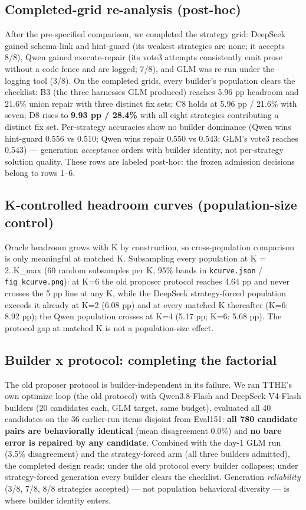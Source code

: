 \subsection{Completed-grid re-analysis
(post-hoc)}\label{completed-grid-re-analysis-post-hoc}

After the pre-specified comparison, we completed the strategy grid:
DeepSeek gained schema-link and hint-guard (its weakest strategies are
none; it accepts 8/8), Qwen gained execute-repair (its vote3 attempts
consistently emit prose without a code fence and are logged; 7/8), and
GLM was re-run under the logging tool (3/8). On the completed grids,
every builder's population clears the checklist: B3 (the three harnesses
GLM produced) reaches 5.96 pp headroom and 21.6\% union repair with
three distinct fix sets; C8 holds at 5.96 pp / 21.6\% with seven; D8
rises to \textbf{9.93 pp / 28.4\%} with all eight strategies
contributing a distinct fix set. Per-strategy accuracies show no builder
dominance (Qwen wins hint-guard 0.556 vs 0.510; Qwen wins repair 0.550 vs 0.543; GLM's vote3 reaches 0.543) --- generation
\emph{acceptance} orders with builder identity, not per-strategy solution
quality.
These rows are labeled post-hoc: the frozen admission decisions belong
to rows 1--6.
\subsection{K-controlled headroom curves (population-size
control)}\label{k-controlled-headroom-curves-population-size-control}

Oracle headroom grows with K by construction, so cross-population
comparison is only meaningful at matched K. Subsampling every population
at K = 2..K\_max (60 random subsamples per K, 95\% bands in
\texttt{kcurve.json} / \texttt{fig\_kcurve.png}): at K=6 the old
proposer protocol reaches 4.64 pp and never crosses the 5 pp line at any
K, while the DeepSeek strategy-forced population exceeds it already at K=2
(6.08 pp) and at every matched K thereafter (K=6: 8.92 pp); the Qwen population
crosses at K=4 (5.17 pp; K=6: 5.68 pp). The protocol gap at matched K is not a
population-size effect.
\subsection{Builder x protocol: completing the
factorial}\label{builder-x-protocol-completing-the-factorial}

The old proposer protocol is builder-independent in its failure. We ran
TTHE's own optimize loop (the old protocol) with Qwen3.8-Flash and
DeepSeek-V4-Flash builders (20 candidates each, GLM target, same
budget), evaluated all 40 candidates on the 36 earlier-run items
disjoint from Eval151: \textbf{all 780 candidate pairs are behaviorally
identical} (mean disagreement 0.0\%) and \textbf{no bare error is
repaired by any candidate}. Combined with the day-1 GLM run (3.5\%
disagreement) and the strategy-forced arm (all three builders admitted),
the completed design reads: under the old protocol every builder
collapses; under strategy-forced generation every builder clears the
checklist. Generation \emph{reliability} (3/8, 7/8, 8/8 strategies
accepted) --- not population behavioral diversity --- is where builder identity enters.
